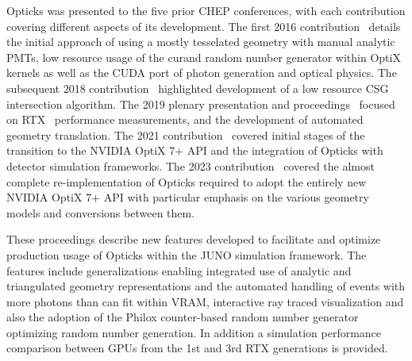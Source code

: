 \documentclass{webofc}
\newcommand{\comment}[1]{}
\begin{document}
Opticks was presented to the five prior CHEP conferences, with each contribution
covering different aspects of its development. 
The first 2016 contribution~\cite{chep2016} details the initial approach of using a mostly tesselated 
geometry with manual analytic PMTs, low resource usage of the curand random number 
generator within OptiX kernels as well as the CUDA port of photon generation and optical physics. 
The subsequent 2018 contribution~\cite{chep2018} highlighted development of a low resource CSG intersection algorithm. 
The 2019 plenary presentation and proceedings~\cite{chep2019} focused on RTX~\cite{rtx} performance measurements, 
and the development of automated geometry translation.  
The 2021 contribution~\cite{chep2021} covered initial stages of the transition to the NVIDIA OptiX 7+ API 
and the integration of Opticks with detector simulation frameworks. The 2023 contribution~\cite{chep2023}
covered the almost complete re-implementation of Opticks required to adopt the entirely new NVIDIA OptiX 7+ API
with particular emphasis on the various geometry models and conversions between them.  
%

These proceedings describe new features developed to facilitate and optimize production usage of Opticks 
within the JUNO simulation framework. The features include generalizations enabling 
integrated use of analytic and triangulated geometry representations and the automated handling of 
events with more photons than can fit within VRAM, interactive ray traced visualization and also the adoption
of the Philox counter-based random number generator optimizing random number generation.
In addition a simulation performance comparison between GPUs from the 1st and 3rd RTX generations
is provided. 
%
%
\comment{
\subsection{Importance of optical photon simulation}%
%
%
Suppression of cosmic muon induced backgrounds with veto selections are crucial for neutrino
detectors such as JUNO~\cite{juno}, necessitating production of large simulated samples of muon events. 
However, a muon of typical energy 200 GeV crossing the JUNO scintillator can yield tens of millions of 
optical photons, which are found with Geant4 simulations to consume more than 99\% of CPU time
and impose severe memory constraints.
%
As optical photons in neutrino detectors can be considered to be produced
only by scintillation and Cherenkov processes and yield only hits
on photomultiplier tubes, it is straightforward to combine an external optical photon simulation 
with a Geant4 simulation of all other particles.
}%
%
\end{document}
